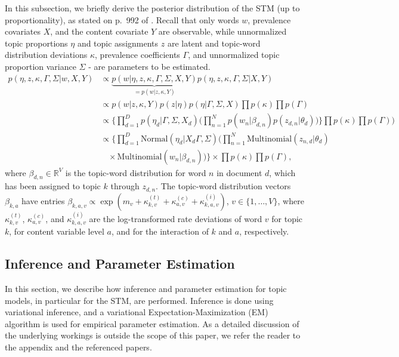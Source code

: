 \documentclass[12pt]{article}
\begin{document}
In this subsection, we briefly derive the posterior distribution of the STM (up to proportionality), as stated on p.\ 992 of \cite{roberts2016model}. Recall that only words $w$, prevalence covariates $X$, and the content covariate $Y$ are observable, while unnormalized topic proportions $\eta$ and topic assignments $z$ are latent and topic-word distribution deviations $\kappa$, prevalence coefficients $\Gamma$, and unnormalized topic proportion variance $\Sigma$ - are parameters to be estimated.
\begin{align*}
p(\eta, z, \kappa, \Gamma, \Sigma | w, X, Y) & \propto \underbrace{p(w | \eta, z, \kappa, \Gamma, \Sigma, X, Y)}_{=p(w | z, \kappa, Y)} p(\eta, z, \kappa, \Gamma, \Sigma | X, Y) \\
& \propto p(w | z, \kappa, Y) p(z | \eta) p(\eta | \Gamma, \Sigma, X) \prod p(\kappa) \prod p(\Gamma) \\
& \propto \Big\{ \prod_{d=1}^{D} p(\eta_d | \Gamma, \Sigma, X_d) \Big( \prod_{n=1}^{N} p(w_n | \beta_{d, n}) p(z_{d,n} | \theta_d) \Big) \Big\} \prod p(\kappa) \prod p(\Gamma)) \\
& \propto \Big\{ \prod_{d=1}^{D} \text{Normal}(\eta_d | X_d \Gamma, \Sigma) \Big( \prod_{n=1}^{N} \text{Multinomial}(z_{n,d}| \theta_d) \\
& \ \ \ \ \times \text{Multinomial}(w_n | \beta_{d,n}) \Big) \Big\} \times \prod p(\kappa) \prod p(\Gamma),
\end{align*}
where $\beta_{d, n} \in \mathbb{R}^V$ is the topic-word distribution for word $n$ in document $d$, which has been assigned to topic $k$ through $z_{d,n}$. The topic-word distribution vectors $\beta_{k,a}$ have entries $\beta_{k,a,v} \propto \exp(m_{v} + \kappa_{k,v}^{(t)} + \kappa_{a,v}^{(c)} + \kappa_{k, a,v}^{(i)})$, $v \in \{1,\dots,V\}$, where $\kappa_{k,v}^{(t)}$, $\kappa_{a,v}^{(c)}$, and $\kappa_{k, a,v}^{(i)}$ are the log-transformed rate deviations of word $v$ for topic $k$, for content variable level $a$, and for the interaction of $k$ and $a$, respectively.

\subsection{Inference and Parameter Estimation}

In this section, we describe how inference and parameter estimation for topic models, in particular for the STM, are performed. Inference is done using variational inference, and a variational Expectation-Maximization (EM) algorithm is used for empirical parameter estimation. As a detailed discussion of the underlying workings is outside the scope of this paper, we refer the reader to the appendix and the referenced papers.
\end{document}
